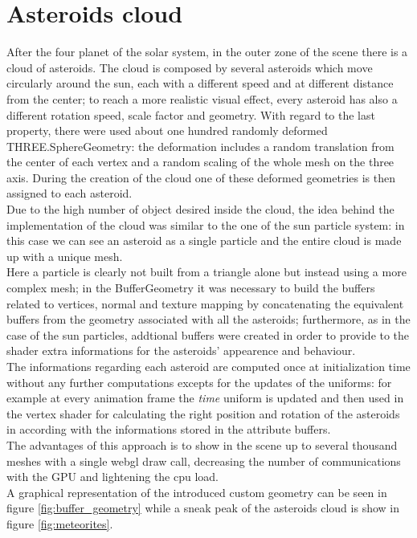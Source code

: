 \documentclass[paper=a4, fontsize=11pt]{scrartcl} %
\numberwithin{equation}{section} %
\numberwithin{figure}{section} %
\numberwithin{table}{section} %
\theoremstyle{definition}
\begin{document}

\section{Asteroids cloud}

After the four planet of the solar system, in the outer zone of the scene there is a cloud of asteroids. The cloud is composed by several asteroids which move circularly around the sun, each with a different speed and at different distance from the center; to reach a more realistic visual effect, every asteroid has also a different rotation speed, scale factor and geometry. With regard to the last property, there were used about one hundred randomly deformed THREE.SphereGeometry: the deformation includes a random translation from the center of each vertex and a random scaling of the whole mesh on the three axis. During the creation of the cloud one of these deformed geometries is then assigned to each asteroid.\\
Due to the high number of object desired inside the cloud, the idea behind the implementation of the cloud was similar to the one of the sun particle system: in this case we can see an asteroid as a single particle and the entire cloud is made up with a unique mesh.\\
Here a particle is clearly not built from a triangle alone but instead using a more complex mesh; in the BufferGeometry it was necessary to build the buffers related to vertices, normal and texture mapping by concatenating the equivalent buffers from the geometry associated with all the asteroids; furthermore, as in the case of the sun particles, addtional buffers were created in order to provide to the shader extra informations for the asteroids' appearence and behaviour.\\
The informations regarding each asteroid are computed once at initialization time without any further computations excepts for the updates of the uniforms: for example at every animation frame the \textit{time} uniform is updated and then used in the vertex shader for calculating the right position and rotation of the asteroids in according with the informations stored in the attribute buffers.\\
The advantages of this approach is to show in the scene up to several thousand meshes with a single webgl draw call, decreasing the number of communications with the GPU and lightening the cpu load.\\
A graphical representation of the introduced custom geometry can be seen in figure \ref{fig:buffer_geometry} while a sneak peak of the asteroids cloud is show in figure \ref{fig:meteorites}.
\end{document}

